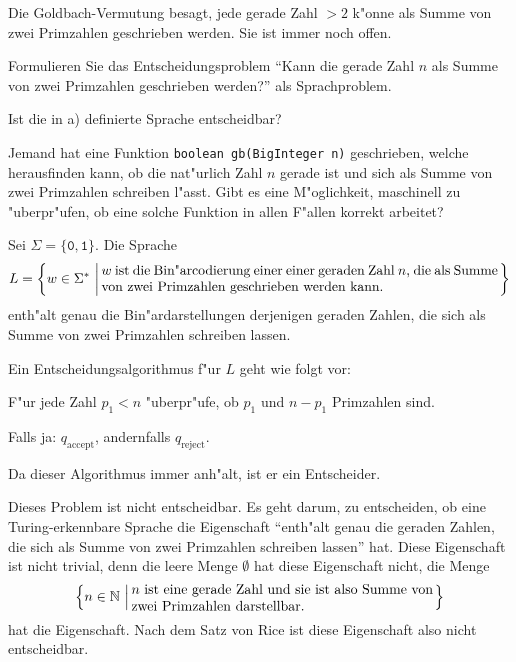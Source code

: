 Die Goldbach-Vermutung besagt, jede gerade Zahl $> 2$ k"onne als Summe von
zwei Primzahlen geschrieben werden. Sie ist immer noch offen.
\begin{teilaufgaben}
\item Formulieren Sie das Entscheidungsproblem ``Kann die gerade Zahl $n$
als Summe von zwei Primzahlen geschrieben werden?'' als Sprachproblem.
\item Ist die in a) definierte Sprache entscheidbar?
\item Jemand hat eine Funktion \texttt{boolean gb(BigInteger n)} geschrieben,
welche herausfinden kann, ob die nat"urlich Zahl $n$ gerade ist und sich
als Summe von zwei Primzahlen schreiben l"asst. Gibt es eine M"oglichkeit,
maschinell zu "uberpr"ufen, ob eine solche Funktion in allen F"allen
korrekt arbeitet?
\end{teilaufgaben}

\begin{loesung}
\begin{teilaufgaben}
\item Sei $\Sigma=\{\texttt{0},\texttt{1}\}$. Die Sprache
\[
L=\left\{ w\in\Sigma^*\,\left|\, \begin{minipage}{4truein}
$w$ ist die Bin"arcodierung einer einer geraden Zahl $n$, die
als Summe von zwei Primzahlen geschrieben werden kann.
\end{minipage}
\right.\right\}
\]
enth"alt genau die Bin"ardarstellungen derjenigen geraden Zahlen,
die sich als Summe von zwei Primzahlen schreiben lassen.
\item Ein Entscheidungsalgorithmus f"ur $L$ geht wie folgt vor:
\begin{compactenum}
\item F"ur jede Zahl $p_1<n$ "uberpr"ufe, ob $p_1$ und $n-p_1$ Primzahlen
sind.
\item Falls ja: $q_{\text{accept}}$, andernfalls $q_{\text{reject}}$.
\end{compactenum}
Da dieser Algorithmus immer anh"alt, ist er ein Entscheider.
\item Dieses Problem ist nicht entscheidbar.
Es geht darum, zu entscheiden, ob eine Turing-erkennbare Sprache
die Eigenschaft
``enth"alt genau die geraden Zahlen, die sich als Summe von zwei Primzahlen
schreiben lassen''
hat.
Diese Eigenschaft ist nicht trivial, denn die leere Menge $\emptyset$ hat
diese Eigenschaft nicht, die Menge
\[
\left\{ n\in\mathbb N\,\left|\,
\begin{minipage}{3truein}
$n$ ist eine gerade Zahl und sie ist also Summe von zwei Primzahlen
darstellbar.
\end{minipage}\right.\right\}
\]
hat die Eigenschaft.
Nach dem Satz von Rice ist diese Eigenschaft also nicht entscheidbar.
\end{teilaufgaben}
\end{loesung}

